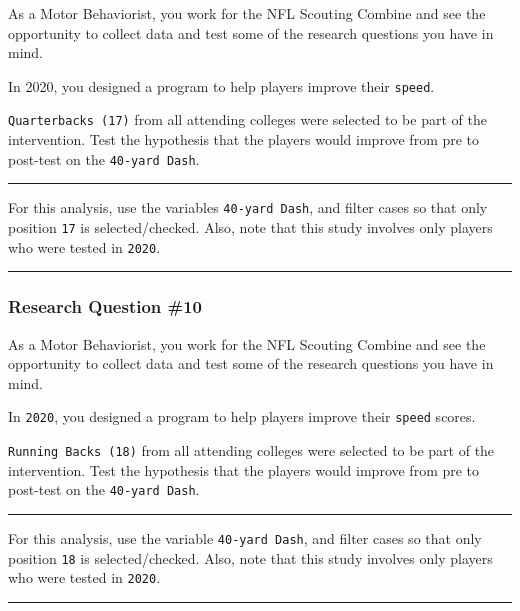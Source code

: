 \documentclass[
]{article}
\begin{document}
As a Motor Behaviorist, you work for the NFL Scouting Combine and see the opportunity to collect data and test some of the research questions you have in mind.

In 2020, you designed a program to help players improve their \texttt{speed}.

\texttt{Quarterbacks\ (17)} from all attending colleges were selected to be part of the intervention. Test the hypothesis that the players would improve from pre to post-test on the \texttt{40-yard\ Dash}.

\begin{center}\rule{0.5\linewidth}{0.5pt}\end{center}

For this analysis, use the variables \texttt{40-yard\ Dash}, and filter cases so that only position \texttt{17} is selected/checked. Also, note that this study involves only players who were tested in \texttt{2020}.

\begin{center}\rule{0.5\linewidth}{0.5pt}\end{center}

\hypertarget{research-question-10}{%
\subsubsection{Research Question \#10}\label{research-question-10}}

As a Motor Behaviorist, you work for the NFL Scouting Combine and see the opportunity to collect data and test some of the research questions you have in mind.

In \texttt{2020}, you designed a program to help players improve their \texttt{speed} scores.

\texttt{Running\ Backs\ (18)} from all attending colleges were selected to be part of the intervention. Test the hypothesis that the players would improve from pre to post-test on the \texttt{40-yard\ Dash}.

\begin{center}\rule{0.5\linewidth}{0.5pt}\end{center}

For this analysis, use the variable \texttt{40-yard\ Dash}, and filter cases so that only position \texttt{18} is selected/checked. Also, note that this study involves only players who were tested in \texttt{2020}.

\begin{center}\rule{0.5\linewidth}{0.5pt}\end{center}
\end{document}
